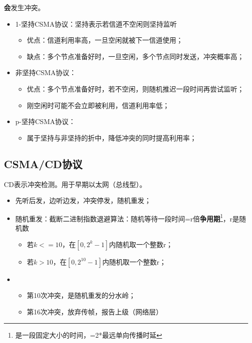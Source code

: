 \textbf{会}发生冲突。

\begin{itemize}
    \item 1-坚持CSMA协议：坚持表示若信道不空闲则坚持监听\begin{itemize}
        \item 优点：信道利用率高，一旦空闲就被下一信道使用；
        \item 缺点：多个节点准备好时，一旦空闲，多个节点同时发送，冲突概率高；
    \end{itemize}
    \item 非坚持CSMA协议：\begin{itemize}
        \item 优点：多个节点准备好时，若不空闲，则随机推迟一段时间再尝试监听；
        \item 刚空闲时可能不会立即被利用，信道利用率低；
    \end{itemize}
    \item p-坚持CSMA协议：\begin{itemize}
        \item 属于坚持与非坚持的折中，降低冲突的同时提高利用率；
    \end{itemize}
\end{itemize}


\subsection{CSMA/CD协议}
CD表示冲突检测。用于早期以太网（总线型）。

\begin{itemize}
    \item 先听后发，边听边发，冲突停发，随机重发；
    \item 随机重发：截断二进制指数退避算法：随机等待一段时间=r倍\textbf{争用期}\footnote{是一段固定大小的时间，=2*最远单向传播时延}，r是随机数\begin{itemize}
        \item 若\(k <= 10\)，在\([0, 2^k - 1]\)内随机取一个整数r；
        \item 若\(k > 10\)，在\([0, 2^{10} - 1]\)内随机取一个整数r；
    \end{itemize}
    \item \begin{itemize}
        \item 第10次冲突，是随机重发的分水岭；
        \item 第16次冲突，放弃传帧，报告上级（网络层）
    \end{itemize}
\end{itemize}

